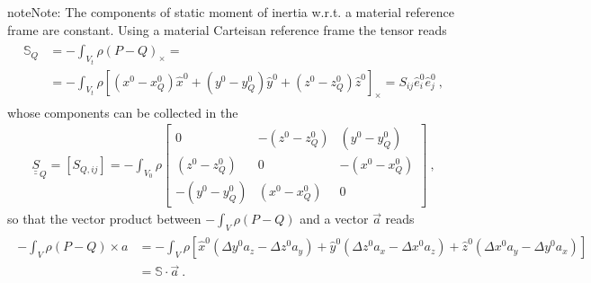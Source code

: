 \documentclass[letterpaper,10pt,english]{jupyterBook}
\begin{document}
\begin{sphinxadmonition}{note}{Note:}
\sphinxAtStartPar
The components of static moment of inertia w.r.t. a material reference frame are constant. Using a material Carteisan reference frame the tensor reads
\begin{equation*}
\begin{split}\begin{aligned}
\mathbb{S}_{Q} 
 & = - \int_{V_t} \rho (P - Q)_{\times} = \\
 & = - \int_{V_t} \rho \left[ ( x^0 - x_Q^0 ) \hat{x}^0 +  ( y^0 - y_Q^0 ) \hat{y}^0 +  ( z^0 - z_Q^0 ) \hat{z}^0 \right]_\times
 = S_{ij} \hat{e}^0_i \hat{e}^0_j \ ,
\end{aligned}\end{split}
\end{equation*}
\sphinxAtStartPar
whose components can be collected in the 
\begin{equation*}
\begin{split}\underline{\underline{S}}_Q = \left[ S_{Q,ij} \right] = - \int_{V_0} \rho \begin{bmatrix} 0 & -(z^0-z^0_Q) & (y^0-y^0_Q) \\ (z^0 - z_Q^0) & 0 & -(x^0-x_Q^0) \\ -(y^0-y^0_Q) & (x^0-x^0_Q) & 0 \end{bmatrix} \ ,\end{split}
\end{equation*}
\sphinxAtStartPar
so that the vector product between \(-\int_V \rho (P-Q)\) and a vector \(\vec{a}\) reads
\begin{equation*}
\begin{split}\begin{aligned}
  - \int_{V} \rho (P-Q) \times a
  & = - \int_V \rho \left[ \hat{x}^0 \left( \Delta y^0 a_z - \Delta z^0 a_y \right) + \hat{y}^0 \left( \Delta z^0 a_x - \Delta x^0 a_z \right) + \hat{z}^0 \left( \Delta x^0 a_y - \Delta y^0 a_x  \right) \right] \\
  & = \mathbb{S} \cdot \vec{a} \ .
\end{aligned}\end{split}
\end{equation*}\end{sphinxadmonition}
\end{document}
